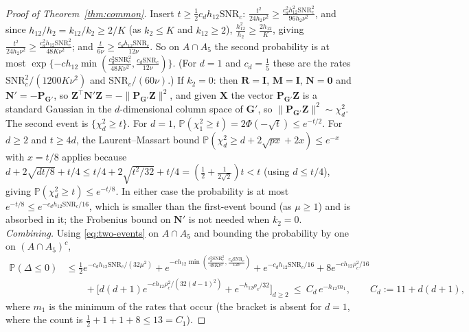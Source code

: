 \documentclass[11pt]{article}
\theoremstyle{definition}
\newcommand{\bX}{\mathbf{X}}
\newcommand{\bZ}{\mathbf{Z}}
\newcommand{\bI}{\mathbf{I}}
\newcommand{\bR}{\mathbf{R}}
\newcommand{\bM}{\mathbf{M}}
\newcommand{\bN}{\mathbf{N}}
\newcommand{\bzero}{\mathbf{0}}
\newcommand{\Prob}{\mathbb{P}}
\begin{document}
\begin{proof}[Proof of Theorem~\ref{thm:common}]
Insert $t\ge\tfrac12c_dh_{12}\mathrm{SNR}_c$: $\frac{t^2}{24h_2\nu^2}\ge\frac{c_d^2h_{12}^2\mathrm{SNR}_c^2}{96h_2\nu^2}$, and since $h_{12}/h_2=k_{12}/k_2\ge2/K$ (as $k_2\le K$ and $k_{12}\ge2$), $\frac{h_{12}^2}{h_2}\ge\frac{2h_{12}}{K}$, giving $\frac{t^2}{24h_2\nu^2}\ge\frac{c_d^2h_{12}\mathrm{SNR}_c^2}{48K\nu^2}$; and $\frac{t}{6\nu}\ge\frac{c_dh_{12}\mathrm{SNR}_c}{12\nu}$. So on $A\cap A_5$ the second probability is at most $\exp\{-ch_{12}\min(\frac{c_d^2\mathrm{SNR}_c^2}{48K\nu^2},\frac{c_d\mathrm{SNR}_c}{12\nu})\}$. (For $d=1$ and $c_d=\tfrac15$ these are the rates $\mathrm{SNR}_c^2/(1200K\nu^2)$ and $\mathrm{SNR}_c/(60\nu)$.) If $k_2=0$: then $\bR=\bI$, $\bM=\bI$, $\bN=\bzero$ and $\bN'=-\mathbf P_{\mathbf G'}$, so $\bZ^\top\bN'\bZ=-\|\mathbf P_{\mathbf G'}\bZ\|^2$, and given $\bX$ the vector $\mathbf P_{\mathbf G'}\bZ$ is a standard Gaussian in the $d$-dimensional column space of $\mathbf G'$, so $\|\mathbf P_{\mathbf G'}\bZ\|^2\sim\chi^2_d$. The second event is $\{\chi^2_d\ge t\}$. For $d=1$, $\Prob(\chi^2_1\ge t)=2\Phi(-\sqrt t)\le e^{-t/2}$. For $d\ge2$ and $t\ge4d$, the Laurent--Massart bound $\Prob(\chi^2_d\ge d+2\sqrt{px}+2x)\le e^{-x}$ with $x=t/8$ applies because $d+2\sqrt{dt/8}+t/4\le t/4+2\sqrt{t^2/32}+t/4=(\tfrac12+\tfrac1{2\sqrt2})t<t$ (using $d\le t/4$), giving $\Prob(\chi^2_d\ge t)\le e^{-t/8}$. In either case the probability is at most $e^{-t/8}\le e^{-c_dh_{12}\mathrm{SNR}_c/16}$, which is smaller than the first-event bound (as $\mu\ge1$) and is absorbed in it; the Frobenius bound on $\bN'$ is not needed when $k_2=0$.
\emph{Combining.} Using \eqref{eq:two-events} on $A\cap A_5$ and bounding the probability by one on $(A\cap A_5)^c$,
\begin{align*}
\Prob(\Delta\le0)&\le\tfrac12e^{-c_dh_{12}\mathrm{SNR}_c/(32\mu^2)}+e^{-ch_{12}\min(\frac{c_d^2\mathrm{SNR}_c^2}{48K\nu^2},\frac{c_d\mathrm{SNR}_c}{12\nu})}+e^{-c_dh_{12}\mathrm{SNR}_c/16}+8e^{-ch_{12}\rho_c^2/16}\\
&\qquad+\Big[d(d+1)e^{-ch_{12}\rho_c^2/(32(d-1)^2)}+e^{-h_{12}\rho_c/32}\Big]_{d\ge2}\ \le\ C_d\,e^{-h_{12}m_1},\qquad C_d:=11+d(d+1),
\end{align*}
where $m_1$ is the minimum of the rates that occur (the bracket is absent for $d=1$, where the count is $\tfrac12+1+1+8\le13=C_1$).


\end{proof}
\end{document}
